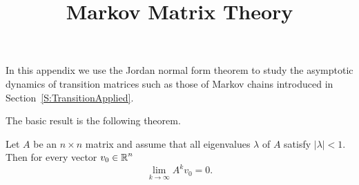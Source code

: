 \documentclass{ximera}
\title{Markov Matrix Theory}
\begin{document}
\begin{abstract}
\end{abstract}
\maketitle


\label{S:TransitionTheory} 

In this appendix we use the Jordan normal form theorem to study the asymptotic
dynamics of transition matrices such as those of 
Markov chains introduced in 
Section~\ref{S:TransitionApplied}.

The basic result is the following theorem.
\begin{theorem} \label{T:convergeto0}
Let $A$ be an $n\times n$ matrix and assume that all eigenvalues $\lambda$ of 
$A$ satisfy $|\lambda|<1$.  Then for every vector $v_0\in\mbox{$\Bbb{R}$}^n$
\begin{equation}  \label{E:convergeto0}
\lim_{k\to\infty} A^kv_0 = 0.
\end{equation}
\end{theorem}
\end{document}
